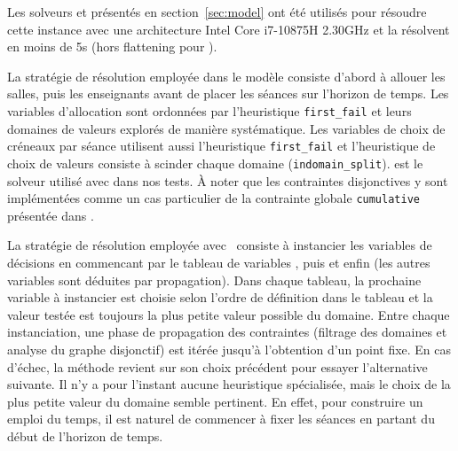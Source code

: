 Les solveurs \MINIZINC{} et \CHRPP{} présentés en section~\ref{sec:model} ont été utilisés pour résoudre cette instance avec une architecture Intel Core i7-10875H 2.30GHz et la résolvent en moins de 5s (hors flattening pour \MINIZINC{}).

La stratégie de résolution employée dans le modèle {\MINIZINC}
consiste d'abord à allouer les salles, puis les enseignants avant de placer les séances sur l'horizon de temps.
Les variables d'allocation sont ordonnées par l'heuristique \texttt{first\_fail} et leurs domaines de valeurs explorés de manière systématique.
Les variables de choix de créneaux par séance utilisent aussi l'heuristique \texttt{first\_fail} et l'heuristique de choix de valeurs consiste à scinder chaque domaine (\texttt{indomain\_split}).
\GECODE{} est le solveur utilisé avec \MINIZINC{} dans nos tests.
À noter que les contraintes disjonctives y sont implémentées comme un cas particulier de la contrainte globale \texttt{cumulative} présentée dans  \cite{beldiceanu2002new}.


La stratégie de résolution employée avec \CHRPP\ consiste à instancier les variables de décisions en commencant par le tableau de variables \arraychr{\xroom}, puis \arraychr{\xteacher} et enfin \arraychr{\xslotstart} (les autres variables sont déduites par propagation). Dans chaque tableau, la prochaine variable à instancier est choisie selon l'ordre de définition dans le tableau et la valeur testée est toujours la plus petite valeur possible du domaine. Entre chaque instanciation, une phase de propagation des contraintes (filtrage des domaines et analyse du graphe disjonctif) est itérée jusqu'à l'obtention d'un point fixe. En cas d'échec, la méthode revient sur son choix précédent pour essayer l'alternative suivante. Il n'y a pour l'instant aucune heuristique spécialisée, mais le choix de la plus petite valeur du domaine semble pertinent. En effet, pour construire un emploi du temps, il est naturel de commencer à fixer les séances en partant du début de l'horizon de temps. 